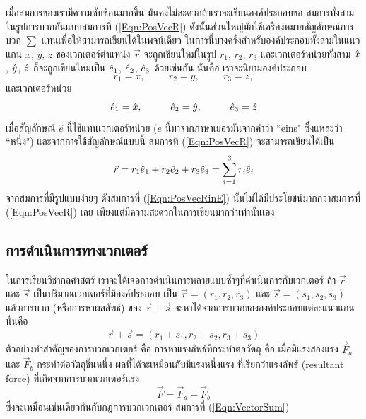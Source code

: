 เมื่อสมการของเรามีความซับซ้อนมากขึ้น มันคงไม่สะดวกถ้าเราจะเขียนองค์ประกอบขอ
สมการทั้งสามในรูปการบวกกันแบบสมการที่ (\ref{Eqn:PosVecR}) ดังนั้นส่วนใหญ่มักใช้เครื่องหมายสัญลักษณ์การบวก $\sum$ แทนเพื่อให้สามารถเขียนได้ในพจน์เดียว ในการนี้บางครั้งสำหรับองค์ประกอบทั้งสามในแนวแกน $x$, $y$, $z$ ของเวกเตอร์ตำแหน่ง $\vec{r}$ จะถูกเขียนใหม่ในรูป $r_1$, $r_2$, $r_3$ และเวกเตอร์หน่วยทั้งสาม $\hat{x}$, $\hat{y}$, $\hat{z}$ ก็จะถูกเขียนใหม่เป็น $\hat{e}_{1}$, $\hat{e}_{2}$, $\hat{e}_{3}$ ด้วยเช่นกัน นั่นคือ เราจะนิยามองค์ประกอบ
\begin{equation}\label{Def:Rcomp}
r_1 = x, \hspace{1cm} r_2 = y, \hspace{1cm} r_3 = z,
\end{equation}
และเวกเตอร์หน่วย
\begin{equation}\label{Def:UnitVecE}
\hat{e}_{1} = \hat{x}, \hspace{1cm} \hat{e}_{2} = \hat{y}, \hspace{1cm} \hat{e}_{3} = \hat{z}
\end{equation}
เมื่อสัญลักษณ์ $\hat{e}$ นี้ใช้แทนเวกเตอร์หน่วย ($e$ นี้มาจากภาษาเยอรมันจากคำว่า ``eins" ซึ่งแหละว่า ``หนึ่ง") และจากการใช้สัญลักษณ์แบบนี้ สมการที่ (\ref{Eqn:PosVecR}) จะสามารถเขียนได้เป็น
\begin{equation}\label{Eqn:PosVecRinE}
\vec{r} = r_1\hat{e}_{1} + r_2\hat{e}_{2} + r_3\hat{e}_{3} = \sum_{i=1}^{3}r_i\hat{e}_{i}
\end{equation}
จากสมการที่มีรูปแบบง่ายๆ ดังสมการที่ (\ref{Eqn:PosVecRinE}) นั้นไม่ได้มีประโยชน์มากกว่าสมการที่ (\ref{Eqn:PosVecR}) เลย เพียงแต่มีความสะดวกในการเขียนมากว่าเท่านั้นเอง

\subsection{การดำเนินการทางเวกเตอร์}
\label{SubSec:VectorOperations}

ในการเรียนวิชากลศาสตร์ เราจะได้เจอการดำเนินการหลายแบบซ้ำๆที่ดำเนินการกับเวกเตอร์ ถ้า $\vec{r}$ และ $\vec{s}$ เป็นปริมาณเวกเตอร์ที่มีองค์ประกอบ เป็น $\vec{r} = (r_1, r_2, r_3)$ และ $\vec{s} = (s_1, s_2, s_3)$ แล้วการ$\textbf{บวก}$ (หรือการหาผลลัพธ์) ของ $\vec{r} + \vec{s}$ จะหาได้จากการบวกขององค์ประกอบแต่ละแนวแกน นั่นคือ
\begin{equation}\label{Eqn:VectorSum}
\vec{r} + \vec{s} = (r_1 + s_1, r_2 + s_2, r_3 + s_3)
\end{equation}
ตัวอย่างทำสำคัญของการบวกเวกเตอร์ คือ การหาแรงลัพธ์ที่กระทำต่อวัตถุ คือ เมื่อมีแรงสองแรง $\vec{F}_a$ และ $\vec{F}_b$ กระทำต่อวัตถุชิ้นหนึ่ง ผลที่ได้จะเหมือนกับมีแรงหนึ่งแรง ที่เรียกว่าแรงลัพธ์ (resultant force) ที่เกิดจากการบวกเวกเตอร์แรง
\begin{equation}\label{Eqn:VecSum2F}
\vec{F} = \vec{F}_a + \vec{F}_b
\end{equation}
ซึ่งจะเหมือนเช่นเดียวกันกับกฎการบวกเวกเตอร์ สมการที่ (\ref{Eqn:VectorSum})

